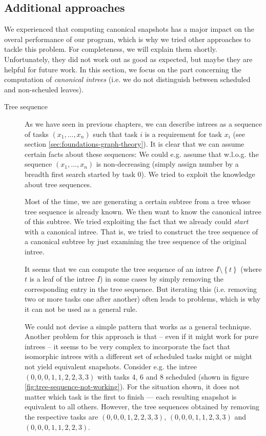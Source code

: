 \subsection{Additional approaches}
\label{sec:algorithm-canonical-snap-additional-approaches}

We experienced that computing canonical snapshots has a major impact on the overal performance of our program, which is why we tried other approaches to tackle this problem. For completeness, we will explain them shortly. Unfortunately, they did not work out as good as expected, but maybe they are helpful for future work. In this section, we focus on the part concerning the computation of \emph{canonical intrees} (i.e. we do not distinguish between scheduled and non-scheuled leaves).

\begin{description}
\item[Tree sequence] As we have seen in previous chapters, we can describe intrees as a sequence of tasks $(x_1,\dots,x_n)$ such that task $i$ is a requirement for task $x_i$ (see section \ref{sec:foundations-graph-theory}). It is clear that we can assume certain facts about these sequences: We could e.g. assume that w.l.o.g. the sequence $(x_1,\dots,x_n)$ is non-decreasing (simply assign number by a breadth first search started by task 0). We tried to exploit the knowledge about tree sequences.

Most of the time, we are generating a certain subtree from a tree whose tree sequence is already known. We then want to know the canonical intree of this subtree. We tried exploiting the fact that we already could \emph{start} with a canonical intree. That is, we tried to construct the tree sequence of a canonical subtree by just examining the tree sequence of the original intree. 

It seems that we can compute the tree sequence of an intree $I\setminus \left\{ t \right\}$ (where $t$ is a leaf of the intree $I$) in some cases by simply removing the corresponding entry in the tree sequence. But iterating this (i.e. removing two or more tasks one after another) often leads to problems, which is why it can not be used as a general rule.

We could not devise a simple pattern that works as a general technique. Another problem for this approach is that -- even if it might work for pure intrees -- it seems to be very complex to incorporate the fact that isomorphic intrees with a different set of scheduled tasks might or might not yield equivalent snapshots. Consider e.g. the intree $(0,0,0,1,1,2,2,3,3)$ with tasks 4, 6 and 8 scheduled (shown in figure \ref{fig:tree-sequence-not-working}). For the situation shown, it does not matter which task is the first to finish --- each resulting snapshot is equivalent to all others. However, the tree sequences obtained by removing the respective tasks are $(0,0,0,1,2,2,3,3)$, $(0,0,0,1,1,2,3,3)$ and $(0,0,0,1,1,2,2,3)$.


\end{description}
